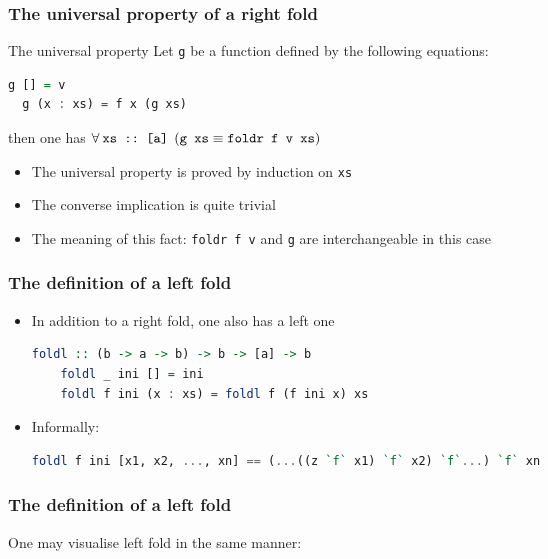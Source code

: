 \documentclass[10pt,pdf,utf8,russian,aspectratio=169]{beamer}
\begin{document}
\begin{frame}[fragile]
  \frametitle{The universal property of a right fold}
\begin{block}{The universal property}
  Let \verb"g" be a function defined by the following equations:
  \begin{lstlisting}[language=Haskell]
  g [] = v
  g (x : xs) = f x (g xs)
  \end{lstlisting}

  then one has $\forall \: \verb"xs :: [a]" \:\: (\verb"g xs" \equiv \verb"foldr f v xs")$
\end{block}
\begin{itemize}
  \item The universal property is proved by induction on \verb"xs"
  \item The converse implication is quite trivial
  \item The meaning of this fact: \verb"foldr f v" and \verb"g" are interchangeable in this case
\end{itemize}
\end{frame}

\begin{frame}[fragile]
  \frametitle{The definition of a left fold}
  \begin{itemize}
    \item In addition to a right fold, one also has a left one
    \begin{lstlisting}[language=Haskell]
    foldl :: (b -> a -> b) -> b -> [a] -> b
    foldl _ ini [] = ini
    foldl f ini (x : xs) = foldl f (f ini x) xs
    \end{lstlisting}
    \item Informally:
    \begin{lstlisting}[language=Haskell]
    foldl f ini [x1, x2, ..., xn] == (...((z `f` x1) `f` x2) `f`...) `f` xn
    \end{lstlisting}
  \end{itemize}
\end{frame}

\begin{frame}
  \frametitle{The definition of a left fold}
  One may visualise left fold in the same manner:
\end{frame}
\end{document}
